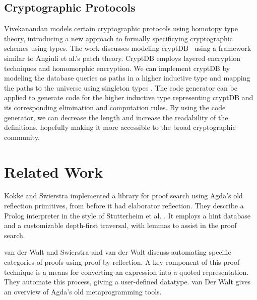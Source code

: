 \documentclass[runningheads]{llncs}
\begin{document}
\subsection{Cryptographic Protocols}
\label{crypto}

Vivekanandan \cite{Paventhan-2018} models certain cryptographic protocols using homotopy type theory,  introducing a new approach to formally specificying cryptographic schemes using types. The work discusses modeling cryptDB~\cite{Popa-2011} using a framework similar to Angiuli et al.'s patch theory. CryptDB employs layered encryption techniques and homomorphic encryption. We can implement cryptDB by modeling the database queries as paths in a higher inductive type and mapping the paths to the universe using singleton types \cite{Angiuli-2014}. The code generator can be applied to generate code for the higher inductive type representing cryptDB and its corresponding elimination and computation rules. By using the code generator, we can decrease the length and increase the readability of the definitions, hopefully making it more accessible to the broad cryptographic community.




\section{Related Work}

Kokke and Swierstra \cite{Kokke-2015} implemented a library for proof search using Agda's old reflection primitives, from before it had elaborator reflection. They describe a Prolog interpreter in the style of Stutterheim et al. \cite{Stutterheim-2013}. It employs a hint database and a customizable depth-first traversal, with lemmas to assist in the proof search.

van der Walt and Swierstra \cite{Walt-2013} and van der Walt \cite{Walt-2012} discuss automating specific categories of proofs using proof by reflection.
A key component of this proof technique is a means for converting an expression into a quoted representation.
They automate this process, giving a user-defined datatype. van Der Walt gives an overview of Agda's old metaprogramming tools.
\end{document}
